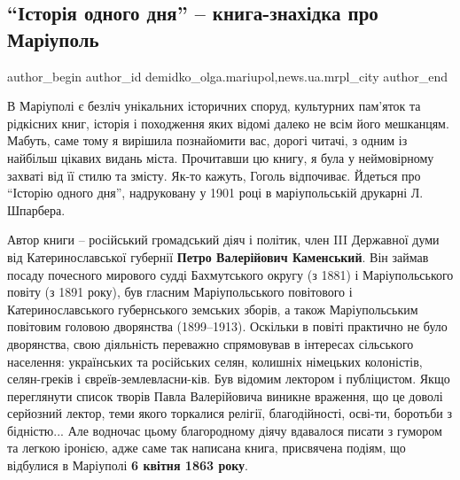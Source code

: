  
 
 
 
 
 
\subsection{\enquote{Історія одного дня} – книга-знахідка про Маріуполь}
\label{sec:04_03_2020.stz.news.ua.mrpl_city.1.knyga_istoria_odnogo_dnja}
 
\ifcmt
 author_begin
   author_id demidko_olga.mariupol,news.ua.mrpl_city
 author_end
\fi


В Маріуполі є безліч унікальних історичних споруд, культурних пам'яток та
рідкісних книг, історія і походження яких відомі далеко не всім його мешканцям.
Мабуть, саме тому я вирішила познайомити вас, дорогі читачі, з одним із
найбільш цікавих видань міста. Прочитавши цю книгу, я була у неймовірному
захваті від її стилю та змісту. Як-то кажуть, Гоголь відпочиває. Йдеться про
\enquote{Історію одного дня}, надруковану у 1901 році в маріупольській друкарні Л.
Шпарбера.

Автор книги – російський громадський діяч і політик, член III Державної думи
від Катеринославської губернії \textbf{Петро Валерійович Каменський}. Він займав посаду
почесного мирового судді Бахмутського округу (з 1881) і Маріупольського повіту
(з 1891 року), був гласним Маріупольського повітового і Катеринославського
губернського земських зборів, а також Маріупольським повітовим головою
дворянства (1899–1913). Оскільки в повіті практично не було дворянства, свою
діяльність переважно спрямовував в інтересах сільського населення: українських
та російських селян, колишніх німецьких колоністів, селян-греків і
євреїв-землевласни\hyp{}ків. Був відомим лектором і публіцистом. Якщо переглянути
список творів Павла Валерійовича виникне враження, що це доволі серйозний
лектор, теми якого торкалися релігії, благодійності, осві\hyp{}ти, боротьби з
бідністю... Але водночас цьому благородному діячу вдавалося писати з гумором та
легкою іронією, адже саме так написана книга, присвячена подіям, що відбулися в
Маріуполі \textbf{6 квітня 1863 року}.


